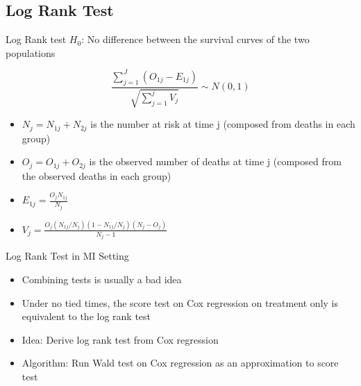 \subsection{Log Rank Test}
\begin{frame}{Log Rank test}
$H_0$: No difference between the survival curves of the two populations

$$\frac{\sum_{j=1}^{J}(O_{1j}-E_{1j})}{\sqrt{\sum_{j=1}^{j}V_{j}}}\sim N(0,1)$$
\begin{itemize}
 \item $N_j=N_{1j}+N_{2j}$ is the number at risk at time j (composed from deaths in each group)
 \item $O_j=O_{1j}+O_{2j}$ is the observed number of deaths at time j (composed from the observed deaths in each group)
 \item $E_{1j}=\frac{O_jN_{1j}}{N_j}$
 \item $V_j=\frac{O_j(N_{1j}/N_j)(1-N_{1j}/N_j)(N_{j}-O_{j})}{N_j -1}$
 \end{itemize}
\end{frame}

\begin{frame}{Log Rank Test in MI Setting}
 \begin{itemize}
 \item Combining tests is usually a bad idea \cite{Marshall2009}
 \item Under no tied times, the score test on
  Cox regression on treatment only is equivalent to the
log rank test
\item Idea: Derive log rank test from Cox regression
\item Algorithm: Run Wald test on Cox regression as an approximation to score test
 \end{itemize}
\end{frame}

